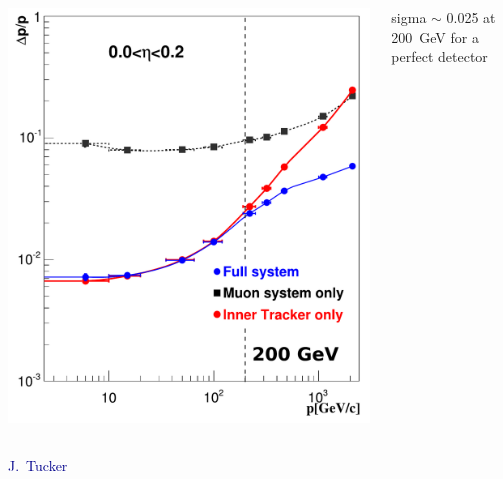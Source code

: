 \documentclass[compress]{beamer}
\begin{document}
\begin{frame}
\begin{columns}
\vspace{0.2 cm}
\includegraphics[width=\linewidth]{Figure_001-005-a_newcolors.pdf}

sigma $\sim$ 0.025 at 200~GeV for a perfect detector
\end{columns}

\vspace{-0.3 cm}
\scriptsize \hspace{3 cm} \textcolor{darkblue}{J.~Tucker}
\end{frame}
\end{document}
